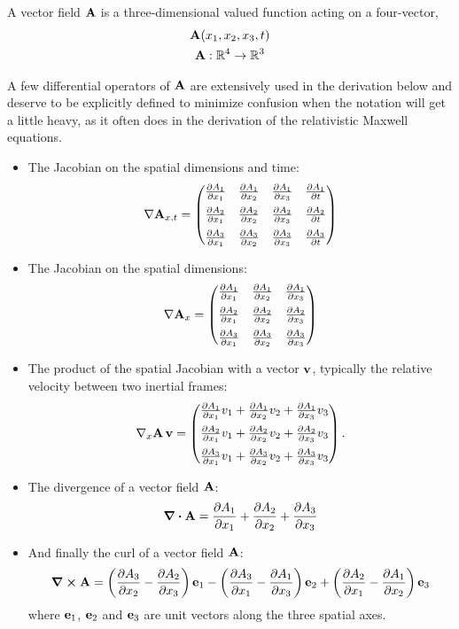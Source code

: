 \documentclass[12pt]{article}
\begin{document}
A vector field $\vb{A}$ is a three-dimensional valued function acting on a four-vector,
\[
  \begin{gathered}
    \vb{A}(x_1, x_2, x_3, t) \\
    \vb{A}: \mathbb{R}^4 \to \mathbb{R}^3
  \end{gathered}
\]

A few differential operators of $\vb{A}$ are extensively used in the derivation below and
deserve to be explicitly defined to minimize confusion when the notation will get a little
heavy, as it often does in the derivation of the relativistic Maxwell equations.

\begin{itemize}
  \item The Jacobian on the spatial dimensions and time:
  \[
    \nabla \vb{A}_{x,t} =
    \begin{pmatrix}
      \pdv{A_1}{x_1} & \pdv{A_1}{x_2} & \pdv{A_1}{x_3} & \pdv{A_1}{t} \\[6pt]
      \pdv{A_2}{x_1} & \pdv{A_2}{x_2} & \pdv{A_2}{x_3} & \pdv{A_2}{t} \\[6pt]
      \pdv{A_3}{x_1} & \pdv{A_3}{x_2} & \pdv{A_3}{x_3} & \pdv{A_3}{t}
    \end{pmatrix}
  \]

  \item The Jacobian on the spatial dimensions:
  \[
    \nabla \vb{A}_{x} =
    \begin{pmatrix}
      \pdv{A_1}{x_1} & \pdv{A_1}{x_2} & \pdv{A_1}{x_3} \\[6pt]
      \pdv{A_2}{x_1} & \pdv{A_2}{x_2} & \pdv{A_2}{x_3} \\[6pt]
      \pdv{A_3}{x_1} & \pdv{A_3}{x_2} & \pdv{A_3}{x_3}
    \end{pmatrix}
  \]

\item The product of the spatial Jacobian with a vector $\vb{v}$, typically the
      relative velocity between two inertial frames:
\[
  \nabla_x\vb{A}\,\vb{v}
  =
  \begin{pmatrix}
    \pdv{A_1}{x_1}v_1+\pdv{A_1}{x_2}v_2+\pdv{A_1}{x_3}v_3 \\[6pt]
    \pdv{A_2}{x_1}v_1+\pdv{A_2}{x_2}v_2+\pdv{A_2}{x_3}v_3 \\[6pt]
    \pdv{A_3}{x_1}v_1+\pdv{A_3}{x_2}v_2+\pdv{A_3}{x_3}v_3
  \end{pmatrix}.
\]

  \item The divergence of a vector field $\vb{A}$:
  \[
    \div \vb{A} = \pdv{A_1}{x_1} + \pdv{A_2}{x_2} + \pdv{A_3}{x_3}
  \]

  \item And finally the curl of a vector field $\vb{A}$:
  \[
    \curl \vb{A} =
      \left(\pdv{A_3}{x_2} - \pdv{A_2}{x_3}\right)\vb{e}_1
      - \left(\pdv{A_3}{x_1} - \pdv{A_1}{x_3}\right)\vb{e}_2
      + \left(\pdv{A_2}{x_1} - \pdv{A_1}{x_2}\right)\vb{e}_3
  \]
  where $\vb{e}_1$, $\vb{e}_2$ and $\vb{e}_3$ are unit vectors along the three spatial axes.
\end{itemize}
\end{document}
